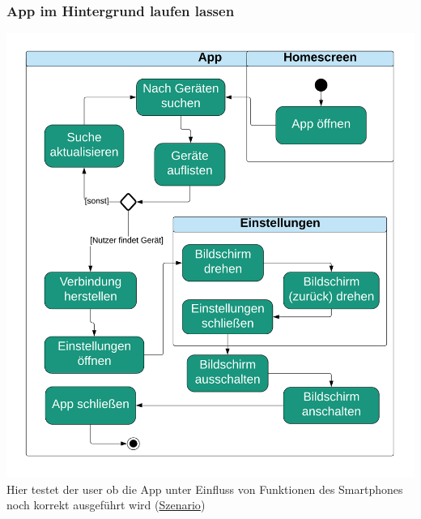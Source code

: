 \documentclass[../pflichtenheft.tex]{subfiles}
\begin{document}
		\subsubsection{App im Hintergrund laufen lassen}
		\label{sec:hintergrund}
			\includegraphics[page=1,width=400pt,keepaspectratio]{../graphics/UML/App_im_Hintergrund_laufen_lassen.png}
			Hier testet der \Gls{user} ob die App unter Einfluss von Funktionen des Smartphones noch korrekt ausgeführt wird (\hyperref[sec:hintergrundS]{Szenario})
\end{document}
